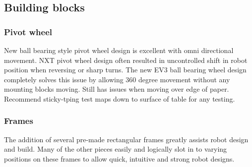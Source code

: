 \documentclass[11pt, a4paper, oneside]{article}
\begin{document}
	\subsection{Building blocks}
		\subsubsection{Pivot wheel}
		New ball bearing style pivot wheel design is excellent with omni directional movement. NXT pivot wheel design often resulted in uncontrolled shift in robot position when reversing or sharp turns. The new EV3 ball bearing wheel design completely solves this issue by allowing 360 degree movement without any mounting blocks moving. Still has issues when moving over edge of paper. Recommend sticky-tping test maps down to surface of table for any testing.
		
		\subsubsection{Frames}
		The addition of several pre-made rectangular frames greatly assists robot design and build. Many of the other pieces easily and logically slot in to varying positions on these frames to allow quick, intuitive and strong robot designs.
		
\end{document}
